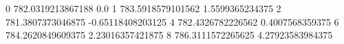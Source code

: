 0 782.0319213867188 0.0
1 783.5918579101562 1.5599365234375
2 781.3807373046875 -0.65118408203125
4 782.4326782226562 0.4007568359375
6 784.2620849609375 2.23016357421875
8 786.3111572265625 4.27923583984375
